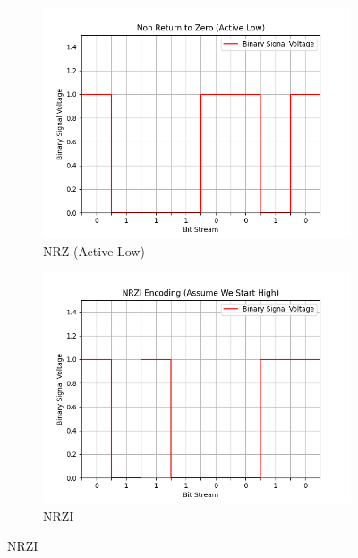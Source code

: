 \documentclass{article}
\begin{document}
    \begin{figure}[H]
        \centering

        \begin{subfigure}{0.49\textwidth}
            \centering
            \includegraphics[width=\linewidth]{nrz}
            \caption{NRZ (Active Low)}
        \end{subfigure}
        \hfill
        \begin{subfigure}{0.49\textwidth}
            \centering
            \includegraphics[width=\linewidth]{nrzi}
            \caption{NRZI}
        \end{subfigure}

        \bigskip


\end{figure}
\end{document}
